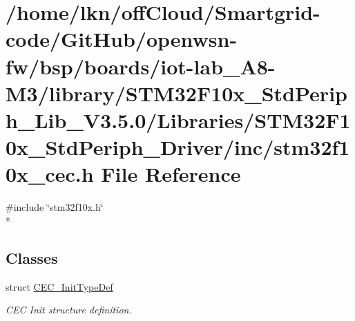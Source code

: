 \hypertarget{iot-lab___a8-_m3_2library_2_s_t_m32_f10x___std_periph___lib___v3_85_80_2_libraries_2_s_t_m32_f1049e339e0f7aefc0402b456e990d1bb27}{}\section{/home/lkn/off\+Cloud/\+Smartgrid-\/code/\+Git\+Hub/openwsn-\/fw/bsp/boards/iot-\/lab\+\_\+\+A8-\/\+M3/library/\+S\+T\+M32\+F10x\+\_\+\+Std\+Periph\+\_\+\+Lib\+\_\+\+V3.5.0/\+Libraries/\+S\+T\+M32\+F10x\+\_\+\+Std\+Periph\+\_\+\+Driver/inc/stm32f10x\+\_\+cec.h File Reference}
\label{iot-lab___a8-_m3_2library_2_s_t_m32_f10x___std_periph___lib___v3_85_80_2_libraries_2_s_t_m32_f1049e339e0f7aefc0402b456e990d1bb27}
{\ttfamily \#include \char`\"{}stm32f10x.\+h\char`\"{}}\\*
\subsection*{Classes}
\begin{DoxyCompactItemize}
\item 
struct \hyperlink{struct_c_e_c___init_type_def}{C\+E\+C\+\_\+\+Init\+Type\+Def}
\begin{DoxyCompactList}\small\item\em C\+EC Init structure definition. \end{DoxyCompactList}\end{DoxyCompactItemize}

